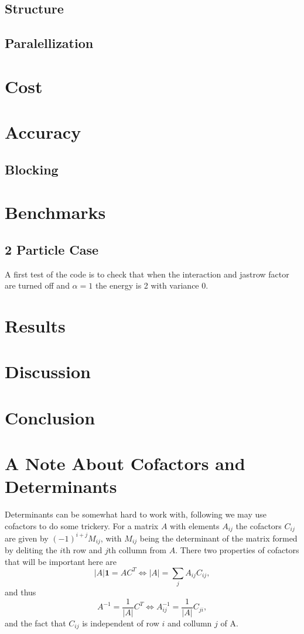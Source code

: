 \documentclass[a4paper,norsk,10pt]{article}
\newcommand{\bb}[1]{\boldsymbol{#1}}
\newcommand{\id}{\bb{1}}
\newcommand{\be}{\begin{equation}}
\newcommand{\ee}{\end{equation}}
\newcommand{\f}{\frac}
\begin{document}
\subsection{Structure}
\subsection{Paralellization}

\section{Cost}

\section{Accuracy}

\subsection{Blocking}

\section{Benchmarks}

\subsection{2 Particle Case}
A first test of the code is to check that when the interaction and jastrow factor are turned off and $\alpha = 1$ the energy is 2 with variance 0.

\section{Results}

\section{Discussion}

\section{Conclusion}



\appendix
\section{A Note About Cofactors and Determinants}\label{cofac}
Determinants can be somewhat hard to work with, following \cite{mortenbok} we may use cofactors to do some trickery.
For a matrix $A$ with elements $A_{ij}$ the cofactors $C_{ij}$ are given by $(-1)^{i+j} M_{ij}$, with $M_{ij}$ being the determinant of the matrix formed by deliting the $i$th
row and $j$th collumn from $A$. There two properties of cofactors that will be important here are
\be
|A|\id = A C^T \Leftrightarrow |A| = \sum_jA_{ij}C_{ij},
\ee
and thus
\be
A^{-1} = \f{1}{|A|}C^T \Leftrightarrow A^{-1}_{ij} = \f{1}{|A|}C_{ji},
\ee
and the fact that $C_{ij}$ is independent of row $i$ and collumn $j$ of A.
\end{document}
